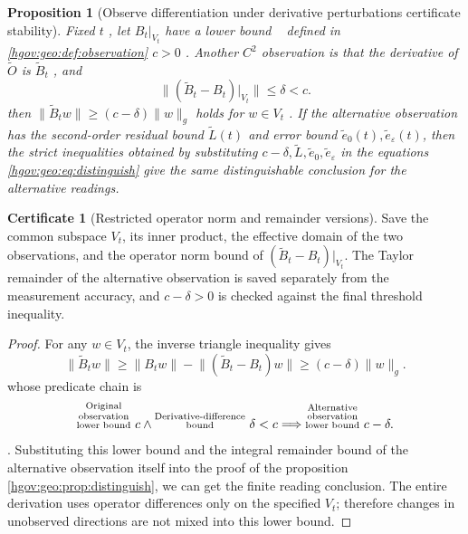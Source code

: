 \documentclass[12pt,a4paper,openany,notitlepage]{report}
\theoremstyle{plain}
\newtheorem{proposition}[theorem]{Proposition}
\theoremstyle{definition}
\newtheorem*{certificate}{Certificate}
\theoremstyle{remark}
\def\mathcal#1{#1}\def\mathsf#1{#1}\def\mathbb#1{#1}%
\begin{document}
\begin{CJK*}
\begin{proposition}
[Observe differentiation under derivative perturbations certificate stability]\label{exp:geo:prop:observation-robustness}
Fixed $t$ , let $B_t|_{V_t}$ have a lower bound ~ defined in \ref{hgov:geo:def:observation} $c>0$ . Another $C^2$ observation is that the derivative of $\widetilde{\mathcal O}$ is $\widetilde B_t$ , and \[
\bigl\|(\widetilde B_t-B_t)|_{V_t}\bigr\|\le\delta<c.
\] then $\lVert\widetilde B_tw\rVert\ge(c-\delta)\lVert w\rVert_g$ holds for $w\in V_t$ . If the alternative observation has the second-order residual bound $\widetilde L(t)$ and error bound $\widetilde e_0(t),\widetilde e_\varepsilon(t)$, then the strict inequalities obtained by substituting $c-\delta,\widetilde L,\widetilde e_0,\widetilde e_\varepsilon$ in the equations ~ \eqref{hgov:geo:eq:distinguish} give the same distinguishable conclusion for the alternative readings.\end{proposition}
\begin{certificate}
[Restricted operator norm and remainder versions]Save the common subspace $V_t$, its inner product, the effective domain of the two observations, and the operator norm bound of $(\widetilde B_t-B_t)|_{V_t}$. The Taylor remainder of the alternative observation is saved separately from the measurement accuracy, and $c-\delta>0$ is checked against the final threshold inequality.\end{certificate}
\begin{proof}
For any $w\in V_t$, the inverse triangle inequality gives \[
\lVert\widetilde B_tw\rVert
\ge\lVert B_tw\rVert-\lVert(\widetilde B_t-B_t)w\rVert
\ge(c-\delta)\lVert w\rVert_g.
\] whose predicate chain is \[
\text{\shortstack[c]{\scriptsize Original\\[-1pt]\scriptsize observation\\[-1pt]\scriptsize lower bound} }c\land\text{\shortstack[c]{\scriptsize Derivative-difference\\[-1pt]\scriptsize bound} }\delta<c
\Longrightarrow\text{\shortstack[c]{\scriptsize Alternative\\[-1pt]\scriptsize observation\\[-1pt]\scriptsize lower bound} }c-\delta.
\]. Substituting this lower bound and the integral remainder bound of the alternative observation itself into the proof of the proposition ~ \ref{hgov:geo:prop:distinguish}, we can get the finite reading conclusion. The entire derivation uses operator differences only on the specified $V_t$; therefore changes in unobserved directions are not mixed into this lower bound.\end{proof}



\end{CJK*}
\end{document}
